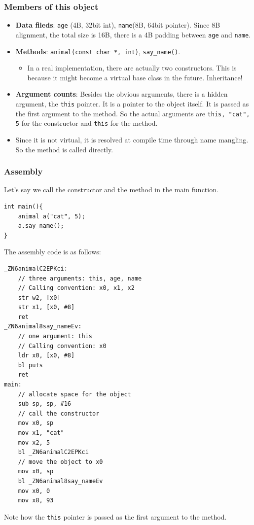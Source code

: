 \documentclass[letterpaper,12pt]{article}
\begin{document}
\subsubsection{Members of this object}
\begin{itemize}
    \item \textbf{Data fileds}: \texttt{age} (4B, 32bit int), \texttt{name}(8B, 64bit pointer). Since 8B alignment, the total size is 16B, there is a 4B padding between \texttt{age} and \texttt{name}.
    \item \textbf{Methods}: \texttt{animal(const char *, int)}, \texttt{say\_name()}. \begin{itemize}
        \item In a real implementation, there are actually two constructors. This is because it might become a virtual base class in the future. Inheritance!
    \end{itemize}
    \item \textbf{Argument counts}: Besides the obvious arguments, there is a hidden argument, the \texttt{this} pointer. It is a pointer to the object itself. It is passed as the first argument to the method. So the actual arguments are \texttt{this, "cat", 5} for the constructor and \texttt{this} for the method.
    \item Since it is not virtual, it is resolved at compile time through name mangling. So the method is called directly.
\end{itemize}
\subsubsection{Assembly}
Let's say we call the constructor and the method in the main function. 
\begin{lstlisting}
int main(){
    animal a("cat", 5);
    a.say_name();
}
\end{lstlisting}
The assembly code is as follows:
\begin{lstlisting}
_ZN6animalC2EPKci:
    // three arguments: this, age, name
    // Calling convention: x0, x1, x2
    str w2, [x0]
    str x1, [x0, #8]
    ret
_ZN6animal8say_nameEv:
    // one argument: this
    // Calling convention: x0
    ldr x0, [x0, #8]
    bl puts
    ret
main:
    // allocate space for the object
    sub sp, sp, #16
    // call the constructor
    mov x0, sp
    mov x1, "cat"
    mov x2, 5
    bl _ZN6animalC2EPKci
    // move the object to x0
    mov x0, sp
    bl _ZN6animal8say_nameEv
    mov x0, 0
    mov x8, 93
\end{lstlisting}
Note how the \texttt{this} pointer is passed as the first argument to the method.
\end{document}
